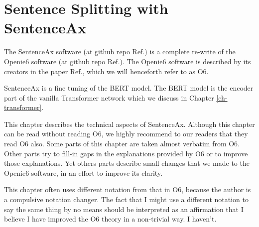 \chapter{Sentence Splitting with SentenceAx}
\label{ch-sentence-ax}

%
%
%


The SentenceAx software (at github repo Ref.\cite{sentence-ax-github}) is a complete re-write of the Openie6 software
(at github repo Ref.\cite{openie6-github}).
 The Openie6 software is described by its creators
 in the paper Ref.\cite{openie6-paper},
 which we will henceforth refer to as O6.

 SentenceAx is a fine tuning of the BERT model.
 The BERT model is the encoder part of the
 vanilla Transformer network which
 we discuss in Chapter \ref{ch-transformer}.

 This chapter describes the technical
 aspects of SentenceAx. Although this chapter
 can be read without reading O6, we highly recommend to
 our readers that they read O6 also.
 Some parts of this chapter are taken almost verbatim
 from O6. Other parts try to fill-in gaps in the
 explanations provided by O6 or to improve those explanations. Yet others parts describe small changes that we made to the Openie6 software, in an effort to improve its clarity.


 This chapter often uses different
 notation from that in O6, because the author
 is a compulsive notation changer. The fact that I
 might use a different notation to say the same thing by no means should be
 interpreted  as an affirmation that I believe I have improved the O6 theory in a non-trivial way. I haven't.

